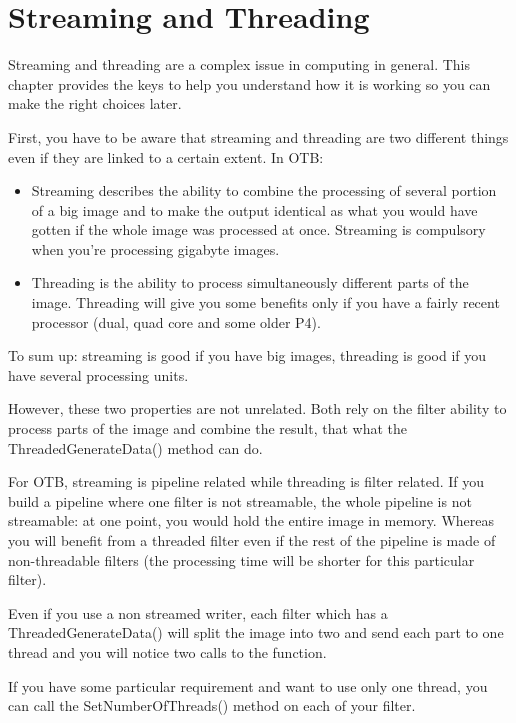\chapter{Streaming and Threading}
\label{sec:StreamingAndThreading}


Streaming and threading are a complex issue in computing in general. This
chapter provides the keys to help you understand how it is working so you can
make the right choices later.

First, you have to be aware that streaming and threading are two different
things even if they are linked to a certain extent. In OTB:

\begin{itemize}
\item Streaming describes the ability to combine the processing of several
portion of a big image and to make the output identical as what you would have
gotten if the whole image was processed at once. Streaming is compulsory when
you're processing gigabyte images. 
\item Threading is the ability to process simultaneously different parts of the
image. Threading will give you some benefits only if you have a fairly recent
processor (dual, quad core and some older P4).
\end{itemize}



To sum up: streaming is good if you have big images, threading is good if you
have several processing units.

However, these two properties are not unrelated. Both rely on the filter ability
to process parts of the image and combine the result, that what the
ThreadedGenerateData() method can do.

For OTB, streaming is pipeline related while threading is filter related. If you
build a pipeline where one filter is not streamable, the whole pipeline is not
streamable: at one point, you would hold the entire image in memory. Whereas you
will benefit from a threaded filter even if the rest of the pipeline is made of
non-threadable filters (the processing time will be shorter for this particular
filter).


Even if you use a non streamed writer, each filter which has a
ThreadedGenerateData() will split the image into two and send each part to one
thread and you will notice two calls to the function.

If you have some particular requirement and want to use only one thread, you can
call the SetNumberOfThreads() method on each of your filter. 

%

